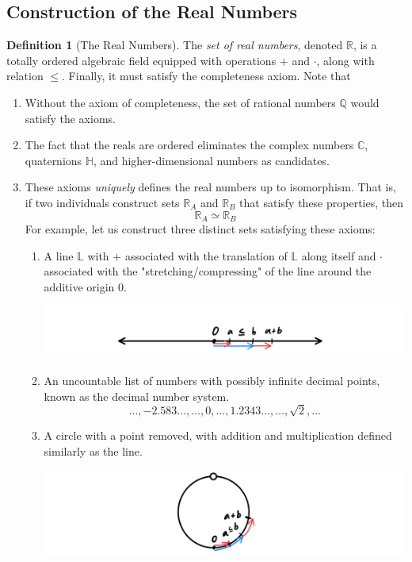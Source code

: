\documentclass{article}
\theoremstyle{remark}
\theoremstyle{definition}
\newtheorem{definition}{Definition}[section]
\begin{document}
\subsection{Construction of the Real Numbers}

\begin{definition}[The Real Numbers]
The \textit{set of real numbers}, denoted $\mathbb{R}$, is a totally ordered algebraic field equipped with operations $+$ and $\cdot$, along with relation $\leq$. Finally, it must satisfy the completeness axiom. Note that
\begin{enumerate}
    \item Without the axiom of completeness, the set of rational numbers $\mathbb{Q}$ would satisfy the axioms. 
    \item The fact that the reals are ordered eliminates the complex numbers $\mathbb{C}$, quaternions $\mathbb{H}$, and higher-dimensional numbers as candidates.  
    \item These axioms \textit{uniquely} defines the real numbers up to isomorphism. That is, if two individuals construct sets  $\mathbb{R}_A$ and $\mathbb{R}_B$ that satisfy these properties, then 
    \[\mathbb{R}_A \simeq \mathbb{R}_B\]
    For example, let us construct three distinct sets satisfying these axioms: 
    \begin{enumerate}
        \item A line $\mathbb{L}$ with $+$ associated with the translation of $\mathbb{L}$ along itself and $\cdot$ associated with the "stretching/compressing" of the line around the additive origin $0$. 
        \begin{center}
            \includegraphics[scale=0.25]{img/Real_Number_Line_Ordered.PNG}
        \end{center}
        \item An uncountable list of numbers with possibly infinite decimal points, known as the decimal number system. 
        \[\ldots, -2.583\ldots, \ldots , 0, \ldots, 1.2343\ldots, \ldots, \sqrt{2}, \ldots\]
        \item A circle with a point removed, with addition and multiplication defined similarly as the line. 
        \begin{center}
            \includegraphics[scale=0.25]{img/Real_Number_Circle_Ordered.PNG}

\end{center}
\end{enumerate}
\end{enumerate}
\end{definition}
\end{document}
